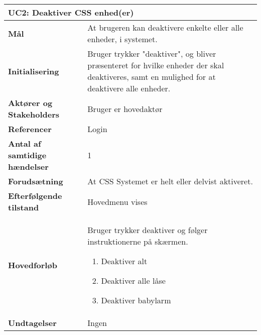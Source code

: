 \begin{table}[H] \centering
\begin{tabular}{|p{6cm}|p{8cm}|}
	\hline
\multicolumn{2}{|l|}{\textbf{UC2: Deaktiver CSS enhed(er)}} \\\hline
\textbf{Mål}	&
At brugeren kan deaktivere enkelte eller alle enheder, i systemet.
\\\hline
\textbf{Initialisering} &
Bruger trykker "deaktiver", og bliver
præsenteret for hvilke enheder der skal deaktiveres, samt en mulighed for at deaktivere alle
enheder. 
\\\hline
\textbf{Aktører og Stakeholders}	&
Bruger er hovedaktør
\\\hline
\textbf{Referencer} &
Login
\\\hline
\textbf{Antal af samtidige hændelser} &
1
\\\hline
\textbf{Forudsætning} &
At CSS Systemet er helt eller delvist aktiveret.
\\\hline
\textbf{Efterfølgende tilstand} &
Hovedmenu vises
\\\hline
\textbf{Hovedforløb}	&
Bruger trykker deaktiver og følger instruktionerne på skærmen. \newline
\begin{enumerate}
\item Deaktiver alt\newline
\item Deaktiver alle låse\newline
\item Deaktiver babylarm\newline
\end{enumerate}
\\\hline
\textbf{Undtagelser}	&
Ingen
\\\hline
	\end{tabular}
	\label{tab:UC2} 
\end{table}